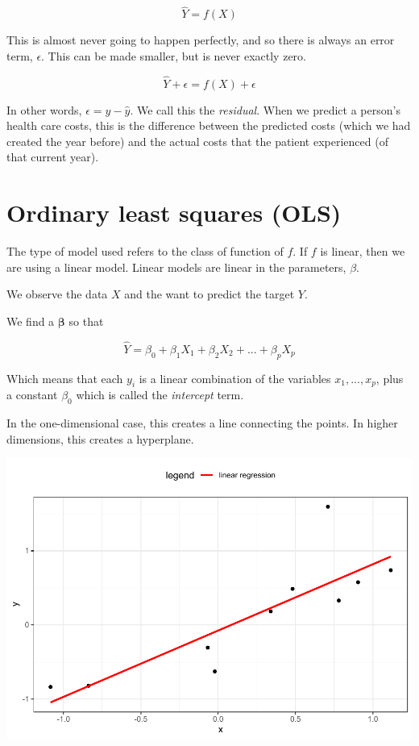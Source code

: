 \documentclass[openany]{book}
\begin{document}
\[\hat{Y} = f(X)\]

This is almost never going to happen perfectly, and so there is always an error term, \(\epsilon\). This can be made smaller, but is never exactly zero.

\[
\hat{Y} + \epsilon = f(X) + \epsilon
\]

In other words, \(\epsilon = y - \hat{y}\). We call this the \emph{residual}. When we predict a person's health care costs, this is the difference between the predicted costs (which we had created the year before) and the actual costs that the patient experienced (of that current year).

\hypertarget{ordinary-least-squares-ols}{%
\section{Ordinary least squares (OLS)}\label{ordinary-least-squares-ols}}

The type of model used refers to the class of function of \(f\). If \(f\) is linear, then we are using a linear model. Linear models are linear in the parameters, \(\beta\).

We observe the data \(X\) and the want to predict the target \(Y\).

We find a \(\mathbf{\beta}\) so that

\[
\hat{Y} = \beta_0 + \beta_1 X_1 + \beta_2 X_2 + ... + \beta_p X_p
\]

Which means that each \(y_i\) is a linear combination of the variables \(x_1, ..., x_p\), plus a constant \(\beta_0\) which is called the \emph{intercept} term.

In the one-dimensional case, this creates a line connecting the points. In higher dimensions, this creates a hyperplane.

\includegraphics{05-linear-models_files/figure-latex/unnamed-chunk-2-1.pdf}
\end{document}
